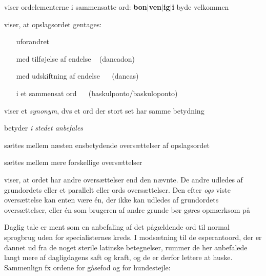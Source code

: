 
\begin{description}[style=multiline,nosep,itemsep=3ex,itemindent=0.5cm]
	\item[\textbar]
	viser ordelementerne i sammensatte ord: \textbf{bon{$\vert$}ven{$\vert$}ig{$\vert$}i} byde velkommen

	\item[\T]
	 viser, at opslagsordet gentages:

	\begin{itemize}[leftmargin=4em, align=left]
		\item[uforandret]  

		\item[med tilf{\o}jelse af endelse] \  (dancadon)
		
		\item[med udskiftning af endelse] \ \  (dancas)
		
		\item[i et sammensat ord] \ \  (baskulponto/baskuloponto)

	\end{itemize}

	\item[=] viser et \textit{synonym}, dvs et ord der stort set har samme betydning
	
	\item[$\rightarrow $] betyder \textit{i stedet anbefales}
	
	\item[,] s{\ae}ttes mellem n{\ae}sten ensbetydende overs{\ae}ttelser af
	opslagsordet
	

	\item[;] s{\ae}ttes mellem mere forskellige overs{\ae}ttelser
	
	\item[ogs] 
	viser, at ordet har andre overs{\ae}ttelser end den n{\ae}vnte.
	De andre udledes af grund\-ord\-ets eller et parallelt
	 eller
	ords overs{\ae}ttelser. Den efter \textit{ogs}
	viste overs{\ae}ttelse kan enten v{\ae}re \'en, der ikke kan udledes af
	grundordets overs{\ae}ttelser, eller \'en som brugeren af andre grunde
	b{\o}r g{\o}res opm{\ae}rksom p{\aa}
	
	\item[dgl] Daglig tale er ment som en anbefaling
	af det p{\aa}g{\ae}ldende ord til normal sprogbrug uden for
	specialisternes kreds. I mods{\ae}tning til de esperantoord, der er
	dannet ud fra de noget sterile latinske betegnelser, rummer de her
	anbefalede langt mere af dagligdagens saft og kraft, og de er derfor
	lettere at huske. Sammenlign fx ordene for g{\aa}sefod og for
	hundestejle:



\end{description}
